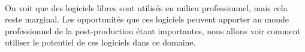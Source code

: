 \paragraph{}

On voit que des logiciels libres sont utilisés en milieu professionnel,
mais cela reste marginal. Les opportunités que ces logiciels peuvent
apporter au monde professionnel de la post-production étant importantes,
nous allons voir comment utiliser le potentiel de ces logiciels dans
ce domaine.
